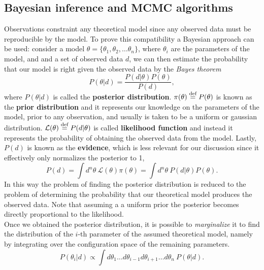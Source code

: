 \subsection{Bayesian inference and MCMC algorithms}
Observations constraint any theoretical model since any observed data must be reproducible by the model. To prove this compatibility a Bayesian approach can be used: consider a model $\theta=\{\theta_1,\theta_2,\dots\theta_n\}$, where $\theta_i$ are the parameters of the model, and and a set of observed data $d$, we can then estimate the probability that our model is right given the observed data by the \emph{Bayes theorem}
\begin{equation}
    P(\theta|d)=\frac{P(d|\theta)P(\theta)}{P(d)},
\end{equation}
where $P(\theta|d)$ is called the \textbf{posterior distribution}. $\pi(\theta)\stackrel{\text{def}}{=} P(\theta)$ is known as the \textbf{prior distribution} and it represents our knowledge on the parameters of the model, prior to any observation, and usually is taken to be a uniform or gaussian distribution.  $\mathcal{L}(\theta)\stackrel{\text{def}}{=} P(d|\theta)$ is called \textbf{likelihood function} and instead it represents the probability of obtaining the observed data from the model. Lastly, $P(d)$ is known as the \textbf{evidence}, which is less relevant for our discussion since it effectively only normalizes the posterior to 1, 
$$P(d)=\int d^n\theta\ \mathcal{L}(\theta)\pi(\theta)=\int d^n\theta\ P(d|\theta)P(\theta).$$
In this way the problem of finding the posterior distribution is reduced to the problem of determining the probability that our theoretical model produces the observed data. Note that assuming a a uniform prior the posterior becomes directly proportional to the likelihood.\\ 
Once we obtained the posterior distribution, it is possible to \emph{marginalize} it to find the distribution of the $i$-th parameter of the assumed theoretical model, namely by integrating over the configuration space of the remaining parameters.
$$P(\theta_i|d)\propto\int d\theta_1\dots d\theta_{i-1}d\theta_{i+1}\dots d\theta_n\ P(\theta|d). $$

